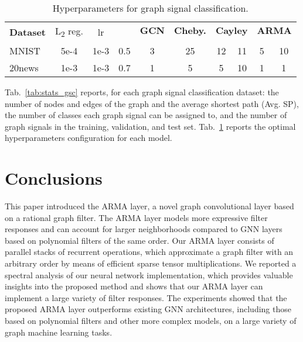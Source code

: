\documentclass{article}
\begin{document}
\begin{table}[!ht]
\setlength\tabcolsep{.2em} \small
\centering
\caption{Hyperparameters for graph signal classification.}
\bgroup
\def\arraystretch{1.0} \begin{tabular}{lccc|c|c|cc|cc}
\cmidrule[1.5pt]{1-10}
\multirow{ 2}{*}{\textbf{Dataset}} & \multirow{ 2}{*}{L\textsubscript{2} reg.} & \multirow{ 2}{*}{lr} & \multirow{ 2}{*}{} & \textbf{GCN} & \textbf{Cheby.} & \multicolumn{2}{c|}{\textbf{Cayley}} & \multicolumn{2}{c}{\textbf{ARMA}} \\
& & & &  &  &  &  &  &  \\
\midrule
MNIST    & 5e-4 & 1e-3 & 0.5  & 3 & 25 & 12 & 11 & 5 & 10 \\ 20news   & 1e-3 & 1e-3 & 0.7  & 1 & 5  & 5  & 10  & 1 & 1  \\ \cmidrule[1.5pt]{1-10}
\end{tabular}
\label{tab:hyper_gsc}
\egroup
\end{table}


Tab.~\ref{tab:stats_gsc} reports, for each graph signal classification dataset: the number of nodes and edges of the graph and the average shortest path (Avg. SP), the number of classes each graph signal can be assigned to, and the number of graph signals in the training, validation, and test set.
Tab.~\ref{tab:hyper_gsc} reports the optimal hyperparameters configuration for each model.

\section{Conclusions}
\label{sec:conclusion}

This paper introduced the ARMA layer, a novel graph convolutional layer based on a rational graph filter.
The ARMA layer models more expressive filter responses and can account for larger neighborhoods compared to GNN layers based on polynomial filters of the same order.
Our ARMA layer consists of parallel stacks of recurrent operations, which approximate a graph filter with an arbitrary order  by means of efficient sparse tensor multiplications. 
We reported a spectral analysis of our neural network implementation, which provides valuable insights into the proposed method and shows that our ARMA layer can implement a large variety of filter responses.
The experiments showed that the proposed ARMA layer outperforms existing GNN architectures, including those based on polynomial filters and other more complex models, on a large variety of graph machine learning tasks. 



\end{document}
